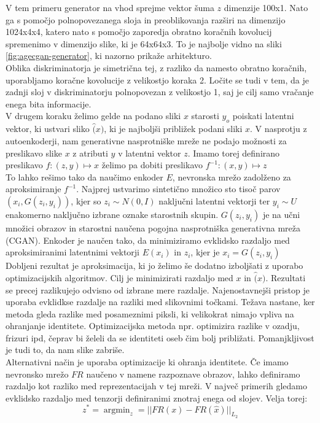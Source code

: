 \documentclass[12pt,a4paper,twoside]{article}
\theoremstyle{definition} %
\theoremstyle{plain} %
\numberwithin{equation}{section}  %
\DeclareMathOperator*{\argminB}{argmin}
\begin{document}
V tem primeru generator na vhod sprejme vektor šuma $z$ dimenzije 100x1. Nato ga s pomočjo polnopovezanega  sloja in preoblikovanja  razširi na dimenzijo 1024x4x4, katero nato s pomočjo zaporedja obratno koračnih kovolucij spremenimo v dimenzijo slike, ki je 64x64x3. 
To je najbolje vidno na sliki \ref{fig:agecgan-generator}, ki nazorno prikaže arhitekturo. 
\\ 
Oblika diskriminatorja je simetrična tej, z razliko da  namesto obratno koračnih, uporabljamo koračne kovolucije z velikostjo  koraka 2. Ločite se tudi v tem, da je zadnji sloj v diskriminatorju  polnopovezan z velikostjo 1,
saj je cilj samo vračanje enega bita informacije.
\\
V drugem koraku želimo gelde na podano sliki $x$ starosti $y_o$ poiskati latentni vektor, ki ustvari sliko $\hat(x)$, ki je najboljši približek podani sliki $x$.  
V nasprotju z autoenkoderji, nam generativne nasprotniške mreže ne podajo možnosti za preslikavo slike $x$ z atributi $y$ v latentni vektor $z$. 
Imamo torej definirano preslikavo $f: (z,y) \mapsto x$ želimo pa dobiti preslikavo $f^{-1}: (x,y) \mapsto z$
\\
To lahko rešimo tako da naučimo enkoder $E$, nevronska mrežo zadolženo za  aproksimiranje $f^{-1}$.  
Najprej ustvarimo sintetično množico sto tisoč parov $(x_i,G(z_i,y_i))$, kjer so $z_i \sim N(0,I)$ naključni latentni vektorji ter $y_i \sim U$  enakomerno naključno izbrane oznake starostnih skupin. $G(z_i,y_i)$ je na učni množici obrazov in starostni 
naučena pogojna nasprotniška generativna mreža (CGAN). Enkoder je naučen tako, da minimiziramo evklidsko razdaljo med aproksimiranimi latentnimi vektorji $E(x_i)$ in $z_i$, kjer je $x_i = G(z_i,y_i)$
\\
Dobljeni rezultat je aproksimacija, ki jo želimo še dodatno izboljšati z uporabo optimizacijskih algoritmov. 
Cilj je minimizirati razdaljo med $x$ in $\hat(x)$.  Rezultati se precej razlikujejo odvisno od izbrane mere razdalje. 
Najenostavnejši pristop je uporaba evklidkse razdalje na razliki med slikovnimi točkami. 
Težava nastane, ker metoda gleda razlike med posameznimi piksli, ki velikokrat nimajo vpliva na ohranjanje identitete. Optimizacijska metoda npr. optimizira razlike v ozadju, frizuri ipd, čeprav bi želeli da se identiteti oseb čim bolj približati. 
Pomanjkljivost je tudi to, da nam slike zabriše. 
\\
Alternativni način je uporaba optimizacije ki ohranja identitete. Če imamo nevronsko mrežo $FR$  naučeno v namene razpoznave obrazov, lahko definiramo razdaljo kot razliko med reprezentacijah v tej mreži. 
V največ primerih gledamo evklidsko razdaljo med tenzorji definiranimi znotraj enega od slojev. 
Velja torej: 
$$z^* =  \argminB_z = || FR(x) -  FR ( \hat{x})  ||_{L_2}$$
\end{document}
